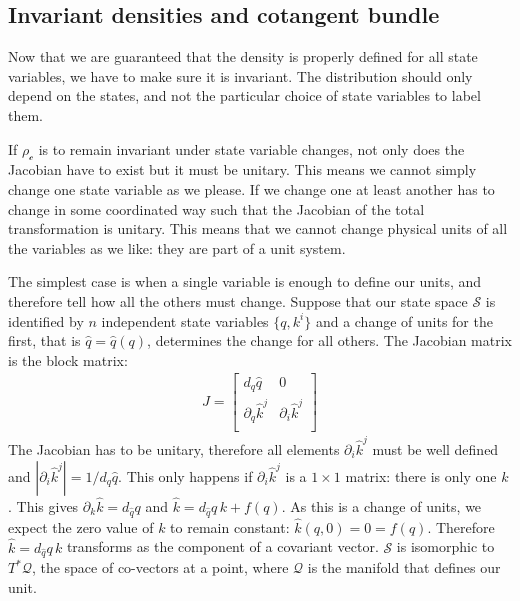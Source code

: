 \documentclass[aps,pra,10pt,twocolumn,floatfix,nofootinbib]{revtex4-1}
\numberwithin{equation}{section}
\theoremstyle{definition}
\begin{document}
\subsection{Invariant densities and cotangent bundle}

Now that we are guaranteed that the density is properly defined for all state variables, we have to make sure it is invariant. The distribution should only depend on the states, and not the particular choice of state variables to label them.

If $\rho_{\mathcal{c}}$ is to remain invariant under state variable changes, not only does the Jacobian have to exist but it must be unitary. This means we cannot simply change one state variable as we please. If we change one at least another has to change in some coordinated way such that the Jacobian of the total transformation is unitary. This  means that we cannot change physical units of all the variables as we like: they are part of a unit system.

The simplest case is when a single variable is enough to define our units, and therefore tell how all the others must change. Suppose that our state space $\mathcal{S}$ is identified by $n$ independent state variables $\{q, k^i\}$ and a change of units for the first, that is $\hat{q} = \hat{q}(q)$, determines the change for all others. The Jacobian matrix is the block matrix:
\begin{align*}
J =  \left[
\begin{array}{cc}
d_q\hat{q} & 0 \\
\partial_q \hat{k}^j & \partial_i \hat{k}^j \\
\end{array}
\right] 
\end{align*}
The Jacobian has to be unitary, therefore all elements $\partial_i \hat{k}^j$ must be well defined and $|\partial_i \hat{k}^j| = 1/d_q\hat{q}$. This only happens if $\partial_i \hat{k}^j$ is a $1\times1$ matrix: there is only one $k$. This gives $\partial_{k} \hat{k} = d_{\hat{q}} q$ and $\hat{k} = d_{\hat{q}} q \, k + f(q)$. As this is a change of units, we expect the zero value of $k$ to remain constant: $\hat{k}(q, 0) = 0 = f(q)$. Therefore $\hat{k} = d_{\hat{q}} q \, k$ transforms as the component of a covariant vector. $\mathcal{S}$ is isomorphic to $T^*\mathcal{Q}$, the space of co-vectors at a point, where $\mathcal{Q}$ is the manifold that defines our unit.
\end{document}
